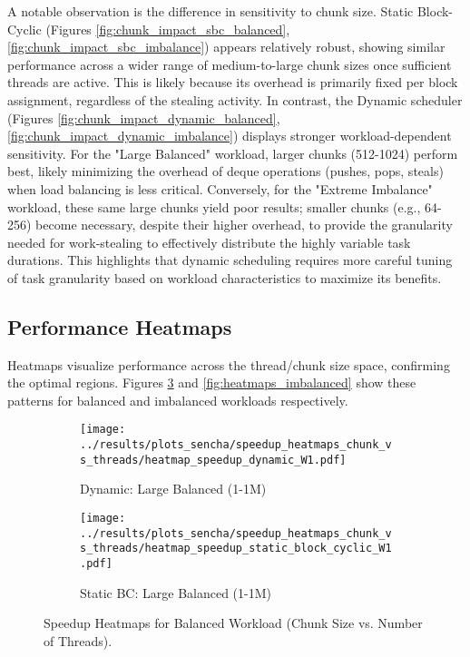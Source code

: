 \documentclass[10pt]{article}
\begin{document}
A notable observation is the difference in sensitivity to chunk size. Static Block-Cyclic (Figures \ref{fig:chunk_impact_sbc_balanced}, \ref{fig:chunk_impact_sbc_imbalance}) appears relatively robust, showing similar performance across a wider range of medium-to-large chunk sizes once sufficient threads are active. This is likely because its overhead is primarily fixed per block assignment, regardless of the stealing activity. In contrast, the Dynamic scheduler (Figures \ref{fig:chunk_impact_dynamic_balanced}, \ref{fig:chunk_impact_dynamic_imbalance}) displays stronger workload-dependent sensitivity. For the "Large Balanced" workload, larger chunks (512-1024) perform best, likely minimizing the overhead of deque operations (pushes, pops, steals) when load balancing is less critical. Conversely, for the "Extreme Imbalance" workload, these same large chunks yield poor results; smaller chunks (e.g., 64-256) become necessary, despite their higher overhead, to provide the granularity needed for work-stealing to effectively distribute the highly variable task durations. This highlights that dynamic scheduling requires more careful tuning of task granularity based on workload characteristics to maximize its benefits.

\subsection{Performance Heatmaps}
Heatmaps visualize performance across the thread/chunk size space, confirming the optimal regions. Figures \ref{fig:heatmaps_balanced} and \ref{fig:heatmaps_imbalanced} show these patterns for balanced and imbalanced workloads respectively.

\begin{figure}[H]
    \centering
    \begin{subfigure}[b]{0.49\textwidth}
        \centering
        \texttt{[image: ../results/plots\_sencha/speedup\_heatmaps\_chunk\_vs\_threads/heatmap\_speedup\_dynamic\_W1.pdf]}
        \caption{Dynamic: Large Balanced (1-1M)}
        \label{fig:heatmap_dynamic_balanced}
    \end{subfigure}
    \hfill
    \begin{subfigure}[b]{0.49\textwidth}
        \centering
        \texttt{[image: ../results/plots\_sencha/speedup\_heatmaps\_chunk\_vs\_threads/heatmap\_speedup\_static\_block\_cyclic\_W1.pdf]}
        \caption{Static BC: Large Balanced (1-1M)}
        \label{fig:heatmap_sbc_balanced}
    \end{subfigure}
    \caption{Speedup Heatmaps for Balanced Workload (Chunk Size vs. Number of Threads).}
    \label{fig:heatmaps_balanced}
\end{figure}
\end{document}

